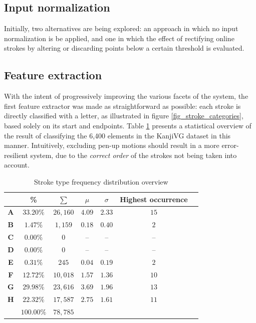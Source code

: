 \documentclass[10pt,conference,a4paper]{IEEEtran}
\begin{document}
	\subsection{Input normalization}

	Initially, two alternatives are being explored: an approach in which no input normalization is be applied, and one 
	in which the effect of rectifying online strokes by altering or discarding points below a certain threshold is evaluated.


	\subsection{Feature extraction}

	With the intent of progressively improving the various facets of the system,
	the first feature extractor was made as straightforward as possible: each stroke is directly
	classified with a letter, as illustrated in figure \ref{fig_stroke_categories}, based solely
	on its start and endpoints. Table \ref{tbl_stroke_analysis} presents a statistical overview of the
	result of classifying the 6,400 elements in the KanjiVG dataset in this manner.
	Intuitively, excluding pen-up motions should result in a more error-resilient system, due to
	the \emph{correct order} of the strokes not being taken into account.


	\begin{table}[b]
		\renewcommand{\arraystretch}{1.3}
		\caption{Stroke type frequency distribution overview }
		\label{tbl_stroke_analysis}
		\centering
		\begin{tabular}{ c | c c c c c l }
			\hline
			  & \bfseries \% & \small $\sum$ & $\mu$ & $\sigma$ & \footnotesize Highest occurrence \\ 
			\hline
			\hline
			\bfseries A & $33.20\%$ & $26,160$ & $4.09$ & $2.33$ & $15$ & \\%
			\bfseries B & $1.47\%$  & $1,159$  & $0.18$ & $0.40$ & $2$  & \\%
			\bfseries C & $0.00\%$  & $0$      & --     & --     & --   & \\%
			\bfseries D & $0.00\%$  & $0$      & --     & --     & --   & \\%
			\bfseries E & $0.31\%$  & $245$    & $0.04$ & $0.19$ & $2$  & \\%
			\bfseries F & $12.72\%$ & $10,018$ & $1.57$ & $1.36$ & $10$ & \\%
			\bfseries G & $29.98\%$ & $23,616$ & $3.69$ & $1.96$ & $13$ & \\%
			\bfseries H & $22.32\%$ & $17,587$ & $2.75$ & $1.61$ & $11$ & \\%
			\hline
			            & $100.00\%$   & $78,785$ &        &        &      & \\
			\hline
		\end{tabular}
	\end{table}
\end{document}
